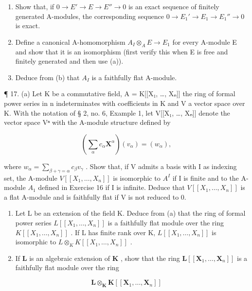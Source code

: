 \begin{enumerate}
\def\labelenumi{(\alph{enumi})}
\item
  Show that, if \(0 \rightarrow E' \rightarrow E \rightarrow E'' \rightarrow 0\) is an exact sequence of finitely generated A-modules, the corresponding sequence \(0 \rightarrow E_{1}' \rightarrow E_{1} \rightarrow E_{1}'' \rightarrow 0\) is exact.
\item
  Define a canonical A-homomorphism \(A_{I} \otimes_{A} E \to E_{1}\) for every A-module E and show that it is an isomorphism (first verify this when E is free and finitely generated and then use (a)).
\item
  Deduce from (b) that \(A_{I}\) is a faithfully flat A-module.
\end{enumerate}

¶ 17. (a) Let K be a commutative field, A = K{[}{[}X₁, \ldots, Xₙ{]}{]} the ring of formal power series in n indeterminates with coefficients in K and V a vector space over K. With the notation of § 2, no. 6, Example 1, let V{[}{[}X₁, \ldots, Xₙ{]}{]} denote the vector space Vⁿ with the A-module structure defined by

\[
\left(\sum_ {\alpha} c _ {\alpha} \mathbf {X} ^ {\alpha}\right) (v _ {\alpha}) = (w _ {\alpha}),
\]

where \(w_{\alpha} = \sum_{\beta + \gamma = \alpha} c_{\beta} v_{\gamma}\) . Show that, if V admits a basis with I as indexing set, the A-module \(V[[X_1, \ldots, X_n]]\) is isomorphic to \(A^I\) if I is finite and to the A-module \(A_1\) defined in Exercise 16 if I is infinite. Deduce that \(V[[X_1, \ldots, X_n]]\) is a flat A-module and is faithfully flat if V is not reduced to 0.

\begin{enumerate}
\def\labelenumi{(\alph{enumi})}
\setcounter{enumi}{1}
\item
  Let L be an extension of the field K. Deduce from (a) that the ring of formal power series \(L[[X_{1},\ldots,X_{n}]]\) is a faithfully flat module over the ring \(K[[X_{1},\ldots,X_{n}]]\) . If L has finite rank over K, \(L[[X_{1},\ldots,X_{n}]]\) is isomorphic to \(L\otimes_{K}K[[X_{1},\ldots,X_{n}]]\) .
\item
  If \(\mathbf{L}\) is an algebraic extension of \(\mathbf{K}\) , show that the ring \(\mathbf{L}[[\mathbf{X}_1, \ldots, \mathbf{X}_n]]\) is a faithfully flat module over the ring
\end{enumerate}

\[
\mathbf {L} \otimes_ {\mathbf {K}} \mathbf {K} [ [ \mathbf {X} _ {1}, \dots , \mathbf {X} _ {n} ] ]
\]


